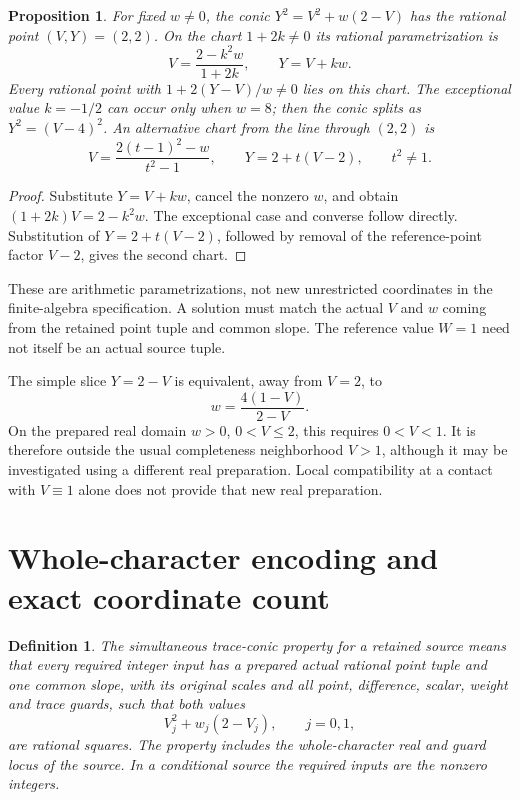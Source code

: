 \documentclass[11pt,a4paper]{article}
\newtheorem{proposition}[theorem]{Proposition}
\newtheorem{definition}[theorem]{Definition}
\begin{document}
\begin{proposition}\label{prop:param}
For fixed \(w\ne0\), the conic \(Y^2=V^2+w(2-V)\) has the
rational point \((V,Y)=(2,2)\). On the chart \(1+2k\ne0\) its
rational parametrization is
\begin{equation}\label{eq:param}
 V=\frac{2-k^2w}{1+2k},\qquad Y=V+kw.
\end{equation}
Every rational point with \(1+2(Y-V)/w\ne0\) lies on this chart.
The exceptional value \(k=-1/2\) can occur only when \(w=8\);
then the conic splits as \(Y^2=(V-4)^2\).
An alternative chart from the line through \((2,2)\) is
\[
 V=\frac{2(t-1)^2-w}{t^2-1},\qquad Y=2+t(V-2),
 \qquad t^2\ne1.
\]
\end{proposition}
\begin{proof}
Substitute \(Y=V+kw\), cancel the nonzero \(w\), and obtain
\((1+2k)V=2-k^2w\). The exceptional case and converse follow
directly. Substitution of \(Y=2+t(V-2)\), followed by removal of
the reference-point factor \(V-2\), gives the second chart.
\end{proof}

These are arithmetic parametrizations, not new unrestricted coordinates
in the finite-algebra specification. A solution must match the actual
\(V\) and \(w\) coming from the retained point tuple and common
slope. The reference value \(W=1\) need not itself be an actual source
tuple.

The simple slice \(Y=2-V\) is equivalent, away from \(V=2\), to
\[
                         w=\frac{4(1-V)}{2-V}.
\]
On the prepared real domain \(w>0\), \(0<V\le2\), this requires
\(0<V<1\). It is therefore outside the usual completeness
neighborhood \(V>1\), although it may be investigated using a
different real preparation. Local compatibility at a contact with
\(V\equiv1\) alone does not provide that new real preparation.

\section{Whole-character encoding and exact coordinate count}

\begin{definition}
The simultaneous trace-conic property for a retained source means
that every required integer input has a prepared actual rational
point tuple and one common slope, with its original scales and all
point, difference, scalar, weight and trace guards, such that both
values
\[
                     V_j^2+w_j(2-V_j),\qquad j=0,1,
\]
are rational squares. The property includes the whole-character real
and guard locus of the source. In a conditional source the required
inputs are the nonzero integers.
\end{definition}
\end{document}
